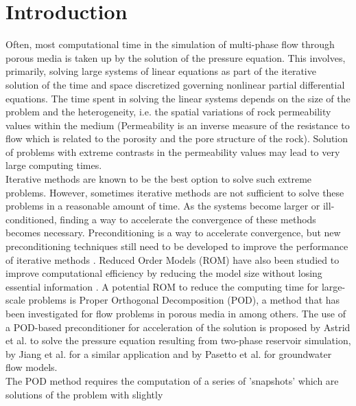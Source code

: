 \documentclass[review]{elsarticle}
\begin{document}
\linenumbers

\section{Introduction}
Often, most computational time in the simulation of multi-phase flow through porous media is taken 
  up by the solution of the pressure equation. 
This involves, primarily, solving large systems of linear equations as 
part of the iterative solution of the time and space discretized governing nonlinear partial differential 
equations. The time spent in solving the linear systems depends on the size of the problem and the heterogeneity, i.e. the spatial
variations of rock permeability values within the medium (Permeability is an inverse measure of the  resistance to flow which is related to the porosity and the pore structure of the rock). Solution of problems with extreme contrasts in the
permeability values may lead to very large computing times. \\
Iterative methods are known to be the best option to solve such extreme problems. However, sometimes iterative methods are not sufficient to solve these problems in a reasonable amount of time. As the systems become larger or ill-conditioned, finding a way to accelerate the convergence of these methods becomes necessary. Preconditioning is a way to accelerate convergence, but new preconditioning techniques still need to be developed to improve the performance of iterative methods \cite{Vuik02,Benzi02}.
Reduced Order Models (ROM) have also been studied to improve computational efficiency by reducing the model size without losing essential information \cite{Antoulas05,Schilders08,Quarteroni14}. 
A potential ROM to reduce the computing time for large-scale problems is Proper Orthogonal 
Decomposition (POD), a method that has been investigated for flow problems in porous media in \cite{Heijn04,Vermeulen04,Mark06,Doren06,Cardoso09,Astrid11,Krogstad11,Efendiev12,Jiang13,Pasetto16} among others. 
The use of a POD-based preconditioner for acceleration of the solution is proposed by Astrid et al.
\cite{Astrid11} to solve the pressure equation resulting from two-phase reservoir simulation, by Jiang et al. \cite{Jiang13} for a similar application and by Pasetto 
et al. \cite{Pasetto16} for groundwater flow models. \\
The POD method requires the computation of a series of 'snapshots' which are solutions of the problem with slightly 
\end{document}
